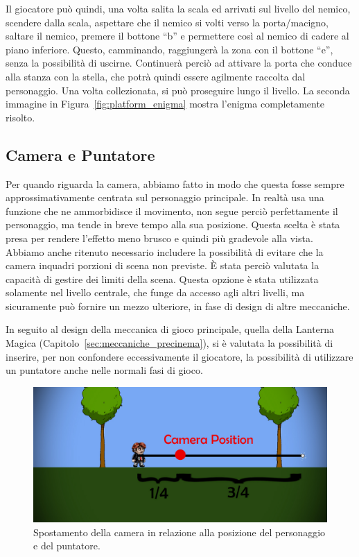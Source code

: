 Il giocatore può quindi, una volta salita la scala ed arrivati sul livello del nemico, scendere dalla scala, aspettare che il nemico si volti verso la porta/macigno, saltare il nemico, premere il bottone “b” e permettere così al nemico di cadere al piano inferiore. Questo, camminando, raggiungerà la zona con il bottone “e”, senza la possibilità di uscirne. Continuerà perciò ad attivare la porta che conduce alla stanza con la stella, che potrà quindi essere agilmente raccolta dal personaggio. Una volta collezionata, si può proseguire lungo il livello.
La seconda immagine in Figura~\ref{fig:platform_enigma} mostra l’enigma completamente risolto.

\subsection{Camera e Puntatore}
\label{sec:camera_e_puntatore}

Per quando riguarda la camera, abbiamo fatto in modo che questa fosse sempre approssimativamente centrata sul personaggio principale. In realtà usa una funzione che ne ammorbidisce il movimento, non segue perciò perfettamente il personaggio, ma tende in breve tempo alla sua posizione. Questa scelta è stata presa per rendere l’effetto meno brusco e quindi più gradevole alla vista.
Abbiamo anche ritenuto necessario includere la possibilità di evitare che la camera inquadri porzioni di scena non previste. È stata perciò valutata la capacità di gestire dei limiti della scena. Questa opzione è stata utilizzata solamente nel livello centrale, che funge da accesso agli altri livelli, ma sicuramente può fornire un mezzo ulteriore, in fase di design di altre meccaniche.

In seguito al design della meccanica di gioco principale, quella della Lanterna Magica (Capitolo~\ref{sec:meccaniche_precinema}), si è valutata la possibilità di inserire, per non confondere eccessivamente il giocatore, la possibilità di utilizzare un puntatore anche nelle normali fasi di gioco.

\begin{figure}%
	\centering
	\includegraphics[width= 0.85\columnwidth]{images/gameDesign/15.jpg}
	\caption{Spostamento della camera in relazione alla posizione del personaggio e del puntatore.}
	\label{fig:camera_posizione_1_4}
\end{figure}

